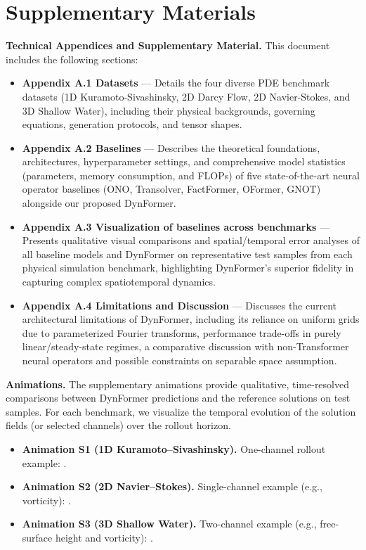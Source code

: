 \documentclass[final,3p,times]{elsarticle}
\begin{document}
\section*{Supplementary Materials}
\textbf{Technical Appendices and Supplementary Material.} This document includes the following sections:
\begin{itemize}
  \item \textbf{Appendix A.1 Datasets} — Details the four diverse PDE benchmark datasets (1D Kuramoto-Sivashinsky, 2D Darcy Flow, 2D Navier-Stokes, and 3D Shallow Water), including their physical backgrounds, governing equations, generation protocols, and tensor shapes.
  \item \textbf{Appendix A.2 Baselines} — Describes the theoretical foundations, architectures, hyperparameter settings, and comprehensive model statistics (parameters, memory consumption, and FLOPs) of five state-of-the-art neural operator baselines (ONO, Transolver, FactFormer, OFormer, GNOT) alongside our proposed DynFormer.
  \item \textbf{Appendix A.3 Visualization of baselines across benchmarks} — Presents qualitative visual comparisons and spatial/temporal error analyses of all baseline models and DynFormer on representative test samples from each physical simulation benchmark, highlighting DynFormer's superior fidelity in capturing complex spatiotemporal dynamics.
  \item \textbf{Appendix A.4 Limitations and Discussion} — Discusses the current architectural limitations of DynFormer, including its reliance on uniform grids due to parameterized Fourier transforms, performance trade-offs in purely linear/steady-state regimes, a comparative discussion with non-Transformer neural operators and possible constraints on separable space assumption.
\end{itemize}

\begin{sloppypar}
  \textbf{Animations.} The supplementary animations provide qualitative, time-resolved comparisons between DynFormer predictions and the reference solutions on test samples. For each benchmark, we visualize the temporal evolution of the solution fields (or selected channels) over the rollout horizon.
  \begin{itemize}
    \item \textbf{Animation S1 (1D Kuramoto--Sivashinsky).} One-channel rollout example: \texttt{}.
    \item \textbf{Animation S2 (2D Navier--Stokes).} Single-channel example (e.g., vorticity): \texttt{}.
    \item \textbf{Animation S3 (3D Shallow Water).} Two-channel example (e.g., free-surface height and vorticity): \texttt{}.
  \end{itemize}
\end{sloppypar}
\end{document}

